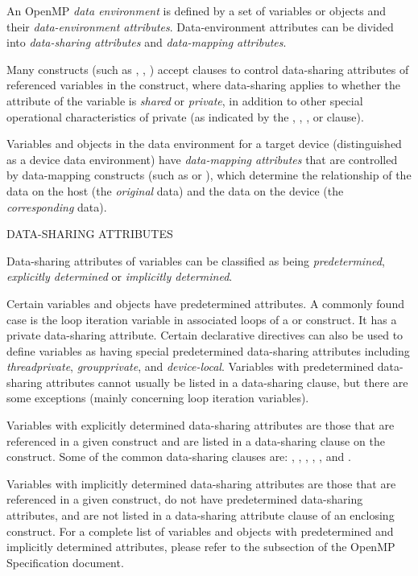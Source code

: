 \label{chap:data_environment}
An OpenMP \emph{data environment} is defined by a set of variables or objects
and their \emph{data-environment attributes}. Data-environment attributes can
be divided into \emph{data-sharing attributes} and \emph{data-mapping
attributes}. 

Many constructs (such as , , ) 
accept clauses to control data-sharing attributes of referenced variables in
the construct, where data-sharing applies to whether the attribute of the
variable is \emph{shared} or \emph{private}, in addition to other special
operational characteristics of private (as indicated by the
, , , or 
clause).

Variables and objects in the data environment for a target device
(distinguished as a device data environment) have \emph{data-mapping
attributes} that are controlled by data-mapping constructs (such as
 or ), which determine the relationship of the
data on the host (the \emph{original} data) and the data on the device (the
\emph{corresponding} data).

\bigskip
DATA-SHARING ATTRIBUTES

Data-sharing attributes of variables can be classified as being \emph{predetermined},
\emph{explicitly determined} or \emph{implicitly determined}.

Certain variables and objects have predetermined attributes.  
A commonly found case is the loop iteration variable in associated loops 
of a  or  construct. It has a private data-sharing
attribute. Certain declarative directives can also be used to define variables
as having special predetermined data-sharing attributes including \emph{threadprivate},
\emph{groupprivate}, and \emph{device-local}. Variables with predetermined
data-sharing attributes cannot usually be listed in a data-sharing clause, but there
are some exceptions (mainly concerning loop iteration variables).

Variables with explicitly determined data-sharing attributes are those that are
referenced in a given construct and are listed in a data-sharing
clause on the construct. Some of the common data-sharing clauses are:
, , , , 
, and . %

Variables with implicitly determined data-sharing attributes are those
that are referenced in a given construct, do not have predetermined
data-sharing attributes, and are not listed in a data-sharing
attribute clause of an enclosing construct.
For a complete list of variables and objects with predetermined and
implicitly determined attributes, please refer to the
subsection of the OpenMP Specification document.  

